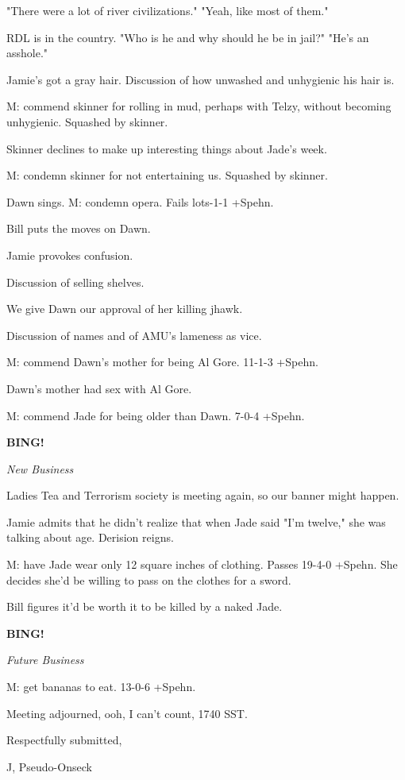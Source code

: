 \documentclass[12pt]{article}
\newcommand{\bing}{{\bf BING!} }
\newcommand{\goto}[1]{\bing \vskip 12pt \centerline{{\em{#1}}}}
\begin{document}
"There were a lot of river civilizations." "Yeah, like most of them."

RDL is in the country. "Who is he and why should he be in jail?" "He's an asshole."

Jamie's got a gray hair. Discussion of how unwashed and unhygienic his hair is.

M: commend skinner for rolling in mud, perhaps with Telzy, without becoming unhygienic. Squashed by skinner.

Skinner declines to make up interesting things about Jade's week.

M: condemn skinner for not entertaining us. Squashed by skinner.

Dawn sings. M: condemn opera. Fails lots-1-1 +Spehn.

Bill puts the moves on Dawn.

Jamie provokes confusion.

Discussion of selling shelves.

We give Dawn our approval of her killing jhawk.

Discussion of names and of AMU's lameness as vice.

M: commend Dawn's mother for being Al Gore. 11-1-3 +Spehn.

Dawn's mother had sex with Al Gore.

M: commend Jade for being older than Dawn. 7-0-4 +Spehn.

\goto{New Business}

Ladies Tea and Terrorism society is meeting again, so our banner might happen.

Jamie admits that he didn't realize that when Jade said "I'm twelve," she was talking about age. Derision reigns.

M: have Jade wear only 12 square inches of clothing. Passes 19-4-0 +Spehn. She decides she'd be willing to pass on the clothes for a sword.

Bill figures it'd be worth it to be killed by a naked Jade.

\goto{Future Business}

M: get bananas to eat. 13-0-6 +Spehn.

\vspace{12pt}

\noindent
Meeting adjourned, ooh, I can't count, 1740 SST.

\vspace{18pt}

\centerline{Respectfully submitted,}
\centerline{J, Pseudo-Onseck}
\end{document}
